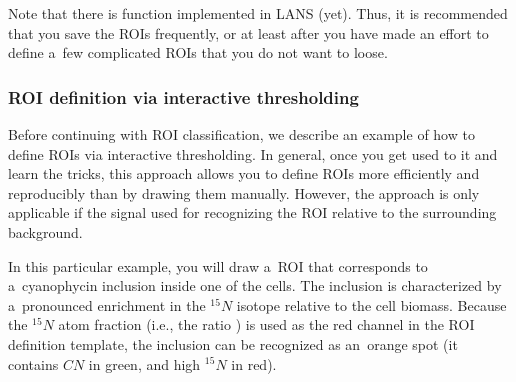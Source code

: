 


Note that there is  function implemented in LANS (yet). Thus, it is recommended that you save the ROIs frequently, or at least after you have made an effort to define a~few complicated ROIs that you do not want to loose.
\tcbe



\subsubsection{ROI definition via interactive thresholding}
\setcounter{step}{0}

\goldbox{}
Before continuing with ROI classification, we describe an example of how to define ROIs via interactive thresholding. In general, once you get used to it and learn the tricks, this approach allows you to define ROIs more efficiently and reproducibly than by drawing them manually. However, the approach is only applicable if the signal used for recognizing the ROI  relative to the surrounding background.
\tcbe

In this particular example, you will draw a~ROI that corresponds to a~cyanophycin inclusion inside one of the cells. The inclusion is characterized by a~pronounced enrichment in the ${}^{15}N$ isotope relative to the cell biomass. Because the ${}^{15}N$ atom fraction (i.e., the ratio ) is used as the red channel in the ROI definition template, the inclusion can be recognized as an~orange spot (it contains $CN$ in green, and high ${}^{15}N$ in red).

